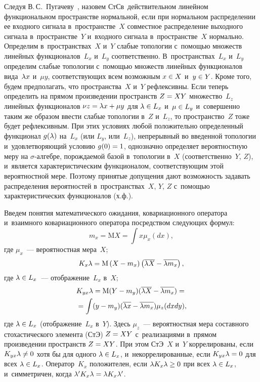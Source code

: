 \begin{multicols}{2}
\vspace*{-6pt}


Следуя В.\,С.~Пугачеву~\cite{6-sin, 7-sin, 8-sin, 9-sin}, 
назовем СтС\linebreak в~действительном линейном функциональном пространстве нормальной, 
если при нормальном распределении ее входного {сигнала} в~пространстве~$X$ 
совместное распределение выходного \mbox{сигнала} в~пространстве~$Y$ и~входного сигнала  в~пространстве~$X$ 
нормально. Определим в~пространствах~$X$ и~$Y$ слабые топологии с~помощью множеств линейных
 функционалов~$L_x$ и~$L_y$ соответственно. В~пространствах~$L_x$ и~$L_y$ 
 определим слабые топологии с~по\-мощью множеств линейных функционалов вида~$\lambda x$ и~$\mu y$, 
 со\-от\-вет\-ст\-ву\-ющих всем возможным  $x\hm\in X$ и~$y \hm\in Y$. Кроме того, 
 будем предполагать, что пространства~$X$ и~$Y$ рефлексивны. Если теперь определить на прямом 
 произведении пространств  $Z\hm=X Y$ множество~$L_z$ линейных функционалов  $\nu z 
 \hm= \la x +\mu y$ для  $\la \hm\in L_x$ и~$ \mu \hm\in L_y$ и~совершенно таким же 
 образом ввести слабые топологии в~$Z$ и~$L_z$, то пространство~$Z$ тоже будет рефлексивным. 
 При этих условиях любой положительно определенный функционал  $g(\lambda)$ на~$L_x$ (или $L_y$, или~$L_z$), 
 непрерывный во введенной топологии и~удовле\-тво\-ря\-ющий условию  $g(0)\hm =1$, 
 однозначно определяет вероятностную меру на $\sigma$-ал\-геб\-ре, по\-рож\-да\-емой базой в~топологии в~$X$ 
 (соответственно~$Y$, $Z$), и~является характеристическим функционалом, соответствующим 
 этой вероятностной мере.
Поэтому принятые допущения дают воз\-мож\-ность задавать распределения вероятностей 
в~пространствах~$X$, $Y$, $Z$ с~по\-мощью характеристических функционалов (х.ф.).

Введем понятия математического ожидания, ковариационного оператора и~взаимного 
ковариационного оператора посредством сле\-ду\-ющих формул:
\begin{equation*}
    m_x = \mathrm{M} X = \int x \mu_x (dx),
\end{equation*}
где $\mu_x$~--- вероятностная мера~$X$;
\begin{equation*}
K_x \lambda = \mathrm{M} \left(X- m_x\right )\left(\overline{\lambda X} - \overline{\lambda m_x}\right),
\end{equation*}
где $\lambda\in L_x$~--- отображение~$L_x$ в~$X$;
\begin{multline*}
    K_{yx} \lambda =\mathrm{M} (Y-m_y)(\overline{\lambda X} -\overline{\lambda m_x}) = {}\\
    {}=\int (y-m_y) 
    (\overline{\lambda x} - \overline{\lambda m_x}) \mu_z (dx dy),
\end{multline*}
где $\la \hm\in L_x$ (отображение~$L_x$ в~$Y$).
Здесь $\mu_z$~--- вероятностная мера со\-став\-но\-го стохастического элемента (СтЭ) 
$Z\hm= X Y$ с~реализациями в~прямом произведении пространств $Z\hm= X Y$. 
При этом СтЭ~$X$ и~$Y$  коррелированы, если  $K_{yx} \la\hm\ne 0$ хотя бы для одного  $\la\hm\in L_x$, 
и~некоррелированные, если $K_{yx}\la\hm=0$ для всех  $\la\hm\in L_x$. Оператор~$K_x$ 
положителен, если $\la K_x \la \hm\ge 0$ при всех  $\la\hm\in L_x$, и~симметричен, когда $\la' K_x \la
\hm = \la K_x \la'$.


\end{multicols}
